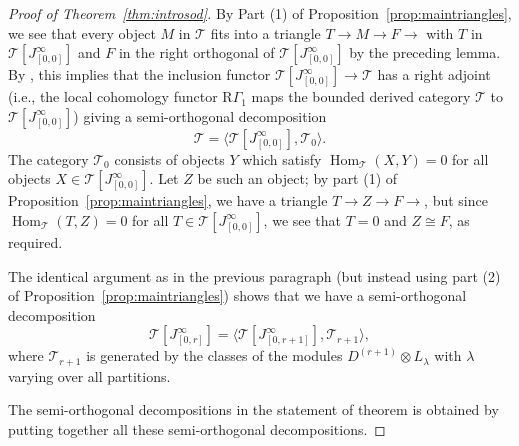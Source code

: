 \documentclass[12pt]{amsart}
\newcommand{\rR}{\mathrm{R}}
\newcommand{\cT}{\mathcal{T}}
\DeclareMathOperator{\Hom}{Hom}
\numberwithin{equation}{section}
\theoremstyle{definition}
\theoremstyle{plain}
\begin{document}
\begin{proof}[Proof of Theorem~\ref{thm:introsod}]
   By Part (1) of Proposition~\ref{prop:maintriangles}, we see that every object $M$ in $\cT$ fits into a triangle $T \to M \to F \to$ with $T$ in $\cT[J_{[0,0]}^{\infty}]$ and $F$ in the right orthogonal of $\cT[J_{[0,0]}^{\infty}]$ by the preceding lemma. By \cite[Proposition~4.9.1]{kra10loc}, this implies that the inclusion functor $\cT[J_{[0,0]}^{\infty}] \to \cT$ has a right adjoint (i.e., the local cohomology functor $\rR \Gamma_1$ maps the bounded derived category $\cT$ to $\cT[J_{[0,0]}^{\infty}]$) giving a semi-orthogonal decomposition 
    \[ \cT = \langle \cT[J_{[0,0]}^{\infty}], \cT_0 \rangle.\]
    The category $\cT_0$ consists of objects $Y$ which satisfy $\Hom_\cT(X, Y) = 0$ for all objects $X \in \cT[J_{[0,0]}^{\infty}]$. Let $Z$ be such an object; by part (1) of  Proposition~\ref{prop:maintriangles}, we have a triangle $T \to Z \to F \to$, but since $\Hom_{\cT}(T, Z) = 0$ for all $T \in \cT[J_{[0,0]}^\infty]$, we see that $T=0$ and $Z \cong F$, as required.
    
    The identical argument as in the previous paragraph (but instead using part (2) of Proposition~\ref{prop:maintriangles}) shows that we have a semi-orthogonal decomposition
    \[ \cT[J_{[0,r]}^{\infty}] = \langle \cT[J_{[0,r+1]}^{\infty}], \cT_{r+1} \rangle, \]
    where $\cT_{r+1}$ is generated by the classes of the modules $D^{(r+1)} \otimes L_{\lambda}$ with $\lambda$ varying over all partitions. 
    
    The semi-orthogonal decompositions in the statement of theorem is obtained by putting together all these semi-orthogonal decompositions.
\end{proof}
\end{document}
